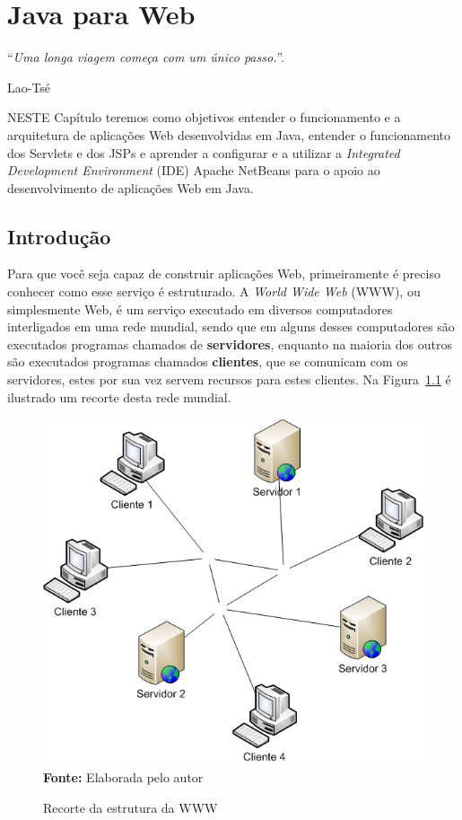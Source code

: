\chapter{Java para Web}
\epigraph{``\textit{Uma longa viagem começa com um único passo.}''.}{Lao-Tsé}

\lettrine[lines=4, lhang=0.1, lraise=0, loversize=0.2, findent=0.1em]{\textcolor{corAzulTema}{N}}{ESTE} Capítulo teremos como objetivos entender o funcionamento e a arquitetura de aplicações Web desenvolvidas em Java, entender o funcionamento dos Servlets e dos JSPs e aprender a configurar e a utilizar a \textit{Integrated Development Environment} (IDE) Apache NetBeans para o apoio ao desenvolvimento de aplicações Web em Java.


\section{Introdução}

Para que você seja capaz de construir aplicações Web, primeiramente é preciso conhecer como esse serviço é estruturado. A \textit{World Wide Web} (WWW), ou simplesmente Web, é um serviço executado em diversos computadores interligados em uma rede mundial, sendo que em alguns desses computadores são executados programas chamados de \textbf{servidores}, enquanto na maioria dos outros são executados programas chamados \textbf{clientes}, que se comunicam com os servidores, estes por sua vez servem recursos para estes clientes. Na Figura~\ref{fig:cap01ClienteServidor} é ilustrado um recorte desta rede mundial.

\FloatBarrier
\begin{figure}[!htbp]
    \centering
    \caption{Recorte da estrutura da WWW}
    \includegraphics[scale=0.6]{imagens/cap01ClienteServidor}
    \\\textbf{Fonte:} Elaborada pelo autor
    \label{fig:cap01ClienteServidor}
\end{figure}
\FloatBarrier

